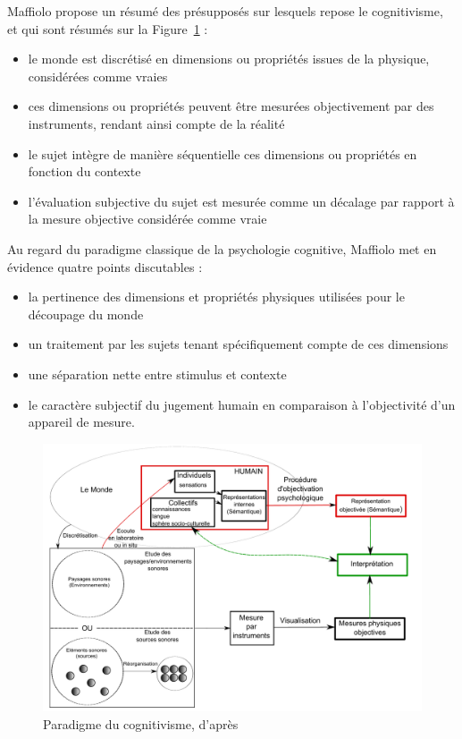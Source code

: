 Maffiolo propose un résumé des présupposés sur lesquels repose le cognitivisme, et qui sont résumés sur la Figure~\ref{fig:paradigmeCognitivisme} \citep[p. ??]{maffiolo_caracterisation_1999} :

\begin{itemize}
\item le monde est discrétisé en dimensions ou propriétés issues de la physique, considérées comme vraies
\item ces dimensions ou propriétés peuvent être mesurées objectivement par des instruments, rendant ainsi compte de la réalité
\item le sujet intègre de manière séquentielle ces dimensions ou propriétés en fonction du contexte
\item l'évaluation subjective du sujet est mesurée comme un décalage par rapport à la mesure objective considérée comme vraie
\end{itemize}

Au regard du paradigme classique de la psychologie cognitive, Maffiolo met en évidence quatre points discutables :

\begin{itemize}
\item la pertinence des dimensions et propriétés physiques utilisées pour le découpage du monde
\item un traitement par les sujets tenant spécifiquement compte de ces dimensions
\item une séparation nette entre stimulus et contexte
\item le caractère subjectif du jugement humain en comparaison à l'objectivité d'un appareil de mesure.
\end{itemize}

\begin{figure}[bth]
        \myfloatalign
        \includegraphics[width=\linewidth]{gfx/Shema_maffiolo}
        \caption[Paradigme du cognitivisme]{Paradigme du cognitivisme, d'après \citep{maffiolo_caracterisation_1999}}\label{fig:paradigmeCognitivisme}
\end{figure}

